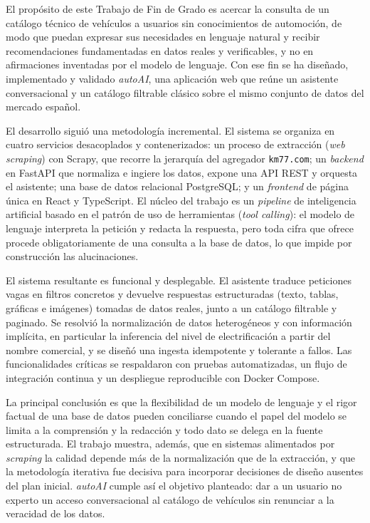 El propósito de este Trabajo de Fin de Grado es acercar la consulta de un
catálogo técnico de vehículos a usuarios sin conocimientos de automoción, de
modo que puedan expresar sus necesidades en lenguaje natural y recibir
recomendaciones fundamentadas en datos reales y verificables, y no en
afirmaciones inventadas por el modelo de lenguaje. Con ese fin se ha diseñado,
implementado y validado \emph{autoAI}, una aplicación web que reúne un asistente
conversacional y un catálogo filtrable clásico sobre el mismo conjunto de datos
del mercado español.

El desarrollo siguió una metodología incremental. El sistema se organiza en
cuatro servicios desacoplados y contenerizados: un proceso de extracción
(\emph{web scraping}) con Scrapy, que recorre la jerarquía del agregador
\texttt{km77.com}; un \emph{backend} en FastAPI que normaliza e ingiere los
datos, expone una API REST y orquesta el asistente; una base de datos relacional
PostgreSQL; y un \emph{frontend} de página única en React y TypeScript. El núcleo
del trabajo es un \emph{pipeline} de inteligencia artificial basado en el patrón
de uso de herramientas (\emph{tool calling}): el modelo de lenguaje interpreta la
petición y redacta la respuesta, pero toda cifra que ofrece procede
obligatoriamente de una consulta a la base de datos, lo que impide por
construcción las alucinaciones.

El sistema resultante es funcional y desplegable. El asistente traduce peticiones
vagas en filtros concretos y devuelve respuestas estructuradas (texto, tablas,
gráficas e imágenes) tomadas de datos reales, junto a un catálogo filtrable y
paginado. Se resolvió la normalización de datos heterogéneos y con información
implícita, en particular la inferencia del nivel de electrificación a partir del
nombre comercial, y se diseñó una ingesta idempotente y tolerante a fallos. Las
funcionalidades críticas se respaldaron con pruebas automatizadas, un flujo de
integración continua y un despliegue reproducible con Docker Compose.

La principal conclusión es que la flexibilidad de un modelo de lenguaje y el
rigor factual de una base de datos pueden conciliarse cuando el papel del modelo
se limita a la comprensión y la redacción y todo dato se delega en la fuente
estructurada. El trabajo muestra, además, que en sistemas alimentados por
\emph{scraping} la calidad depende más de la normalización que de la extracción,
y que la metodología iterativa fue decisiva para incorporar decisiones de diseño
ausentes del plan inicial. \emph{autoAI} cumple así el objetivo planteado: dar a
un usuario no experto un acceso conversacional al catálogo de vehículos sin
renunciar a la veracidad de los datos.
